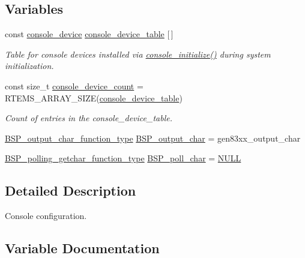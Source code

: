 \subsection*{Variables}
\begin{DoxyCompactItemize}
\item 
const \mbox{\hyperlink{structconsole__device}{console\+\_\+device}} \mbox{\hyperlink{group__ConsoleTermios_ga7f058e756eb724397922b823131fba5c}{console\+\_\+device\+\_\+table}} \mbox{[}$\,$\mbox{]}
\begin{DoxyCompactList}\small\item\em Table for console devices installed via \mbox{\hyperlink{arm_2raspberrypi_2console_2console-config_8c_a4bdc321ef3ab62a261d77b5dbe075566}{console\+\_\+initialize()}} during system initialization. \end{DoxyCompactList}\item 
const size\+\_\+t \mbox{\hyperlink{group__ConsoleTermios_gabca2c9c9873b0482f9fd306e6bade017}{console\+\_\+device\+\_\+count}} = R\+T\+E\+M\+S\+\_\+\+A\+R\+R\+A\+Y\+\_\+\+S\+I\+ZE(\mbox{\hyperlink{group__ConsoleTermios_ga7f058e756eb724397922b823131fba5c}{console\+\_\+device\+\_\+table}})
\begin{DoxyCompactList}\small\item\em Count of entries in the console\+\_\+device\+\_\+table. \end{DoxyCompactList}\item 
\mbox{\hyperlink{bspIo_8h_a0b0dff1c3d35110ae303b4098c60dc14}{B\+S\+P\+\_\+output\+\_\+char\+\_\+function\+\_\+type}} \mbox{\hyperlink{powerpc_2gen83xx_2console_2console-config_8c_a5fb8c9c4f076f0340b4a17ed432ced5c}{B\+S\+P\+\_\+output\+\_\+char}} = gen83xx\+\_\+output\+\_\+char
\item 
\mbox{\hyperlink{bspIo_8h_a132b9ceff428a634ece5dfaac7ef1006}{B\+S\+P\+\_\+polling\+\_\+getchar\+\_\+function\+\_\+type}} \mbox{\hyperlink{powerpc_2gen83xx_2console_2console-config_8c_ae5846eecdfa8f2813504371bf01c29b0}{B\+S\+P\+\_\+poll\+\_\+char}} = \mbox{\hyperlink{bestcomm__api_8h_a872bb74de61c3689ccd5b41873fce42c}{N\+U\+LL}}
\end{DoxyCompactItemize}


\subsection{Detailed Description}
Console configuration. 



\subsection{Variable Documentation}
\mbox{\label{powerpc_2gen83xx_2console_2console-config_8c_a5fb8c9c4f076f0340b4a17ed432ced5c}} 
